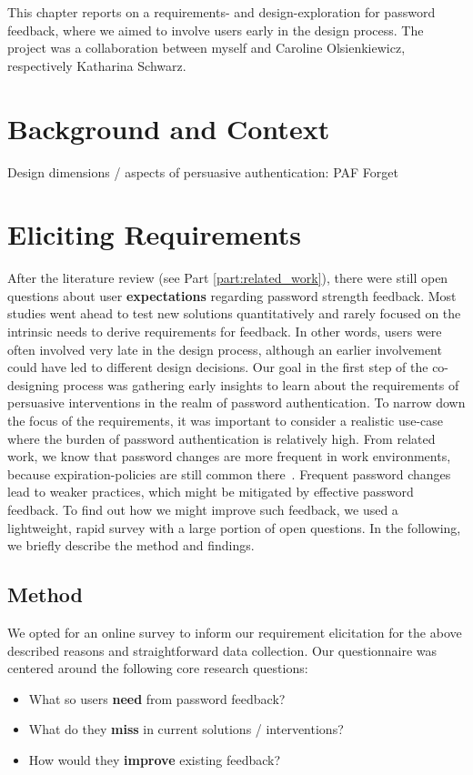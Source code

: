 This chapter reports on a requirements- and design-exploration for password feedback, where we aimed to involve users early in the design process. The project was a collaboration between myself and Caroline Olsienkiewicz, respectively Katharina Schwarz. 

\section{Background and Context}

Design dimensions / aspects of persuasive authentication: PAF Forget \etal \cite{Forget2007PersuasionEducationSecurity}


\section{Eliciting Requirements}
After the literature review (see Part \ref{part:related_work}), there were still open questions about user \textbf{expectations} regarding password strength feedback. Most studies went ahead to test new solutions quantitatively and rarely focused on the intrinsic needs to derive requirements for feedback. In other words, users were often involved very late in the design process, although an earlier involvement could have led to different design decisions. Our goal in the first step of the co-designing process was gathering early insights to learn about the requirements of persuasive interventions in the realm of password authentication. 
%
To narrow down the focus of the requirements, it was important to consider a realistic use-case where the burden of password authentication is relatively high. From related work, we know that password changes are more frequent in work environments, because expiration-policies are still common there \cite{Inglesant2010TrueCostOfUnusablePolicies}. Frequent password changes lead to weaker practices, which might be mitigated by effective password feedback. To find out how we might improve such feedback, we used a lightweight, rapid survey with a large portion of open questions. In the following, we briefly describe the method and findings. 
 

\subsection{Method}
We opted for an online survey to inform our requirement elicitation for the above described reasons and straightforward data collection. Our questionnaire was centered around the following core research questions:
\begin{itemize}
	\item What so users \textbf{need} from password feedback?
	\item What do they \textbf{miss} in current solutions / interventions?
	\item How would they \textbf{improve} existing feedback?
\end{itemize}

